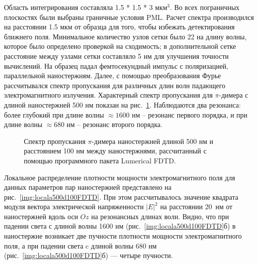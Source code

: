 Область интегрирования составляла 1.5 * 1.5 * 3 мкм$ ^3 $. Во всех пограничных плоскостях были выбраны граничные условия PML. Расчет спектра производился на расстоянии 1.5 мкм от образца для того, чтобы избежать детектирования ближнего поля. Минимальное количество узлов сетки было 22 на длину волны, которое было определено проверкой на сходимость; в дополнительной сетке расстояние между узлами сетки составляло 5 нм для улучшения точности вычислений. На образец падал фемтосекундный импульс с поляризацией, параллельной наностержням. Далее, с помощью преобразования Фурье рассчитывался спектр пропускания для различных длин волн падающего электромагнитного излучения. Характерный спектр пропускания для $ \pi $-димера с длиной наностержней 500 нм показан на рис.~\ref{img:spectraFDTDa500d100}. Наблюдаются два резонанса: более глубокий при длине волны $ \approx 1600 $ нм  -- резонанс первого порядка, и при длине волны $ \approx 680 $ нм -- резонанс второго порядка.
\begin{figure}
\caption{Спектр пропускания $ \pi $-димера наностержней длиной 500 нм и расстоянием 100 нм между наностержнями, рассчитанный с помощью программного пакета Lumerical FDTD.}
\label{img:spectraFDTDa500d100}
\end{figure}

Локальное распределение плотности мощности электромагнитного поля для данных параметров пар наностержней представлено на рис.~\ref{img:locala500d100FDTD}. При этом рассчитывалось значение квадрата модуля вектора электрической напряженности $ \lvert E \rvert ^2 $ на расстоянии 20~нм от наностержней вдоль оси $ Oz $ на резонансных длинах волн. Видно, что при падении света с длиной волны 1600 нм (рис.~\ref{img:locala500d100FDTD}б) в наностержне возникает две пучности плотности мощности электромагнитного поля, а при падении света c длиной волны 680 нм (рис.~\ref{img:locala500d100FDTD}б) --- четыре пучности.

